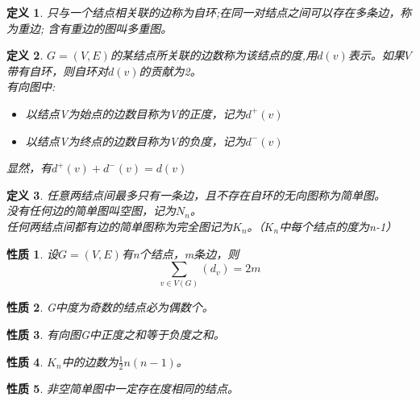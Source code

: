 \documentclass[11pt,a4paper,openany]{book}
\newtheorem{defination}{\textbf{定义}}[section]
\newtheorem{property}{\textbf{性质}}[section]
\begin{document}
\begin{defination}
只与一个结点相关联的边称为\textcolor[rgb]{1.00,0.00,0.00}{自环};在同一对结点之间可以存在多条边，称为\textcolor[rgb]{1.00,0.00,0.00}{重边};
含有重边的图叫\textcolor[rgb]{1.00,0.00,0.00}{多重图}。
\end{defination}
\begin{defination}
$G=(V,E)$的某结点所关联的边数称为该结点的度,用$d(v)$表示。如果$V$带有自环，则自环对$d(v)$的贡献为2。\\
有向图中:
\vspace{-15pt}
\begin{itemize}
  \item[-] 以结点V为始点的边数目称为V的正度，记为$d^{+}(v)$
  \item[-] 以结点V为终点的边数目称为V的负度，记为$d^{-}(v)$
\end{itemize}
显然，有$d^{+}(v)+d^{-}(v)=d(v)$
\end{defination}
\begin{defination}
任意两结点间最多只有一条边，且不存在自环的无向图称为\textcolor[rgb]{1.00,0.00,0.00}{简单图}。\\
没有任何边的简单图叫\textcolor[rgb]{1.00,0.00,0.00}{空图}，记为$N_n$。\\
任何两结点间都有边的简单图称为\textcolor[rgb]{1.00,0.00,0.00}{完全图}记为$K_n$。（$K_n$中每个结点的度为n-1）
\end{defination}
\begin{property}
{设$G=(V,E)$有n个结点，m条边，则}$$\sum_{v\in V(G)}(d_v)=2m$$
\end{property}

\begin{property}
G中度为奇数的结点必为偶数个。
\end{property}
\begin{property}
有向图G中正度之和等于负度之和。
\end{property}
\begin{property}
$K_n$中的边数为$\frac{1}{2}n(n-1)$。
\end{property}
\begin{property}
非空简单图中一定存在度相同的结点。
\end{property}
\end{document}
